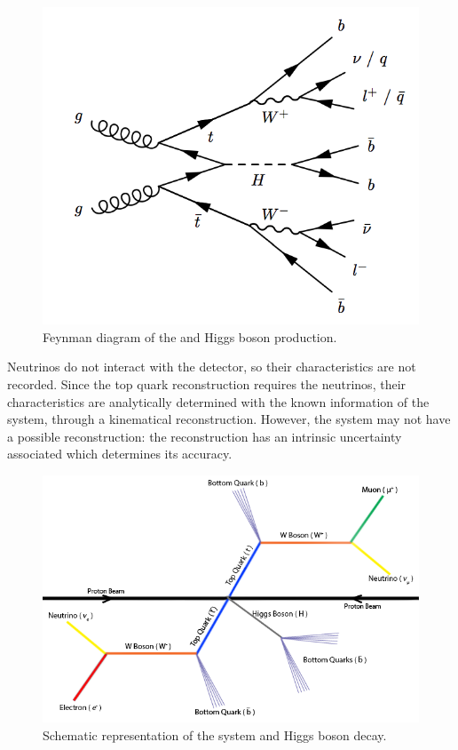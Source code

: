 \begin{figure}[!htp]
	\begin{center}
		\includegraphics[scale=0.3]{imgs/ttH_feynman.png}
		\caption{Feynman diagram of the \ttbar and Higgs boson production.}
		\label{fig:ttH}
	\end{center}
\end{figure}

Neutrinos do not interact with the detector, so their characteristics are not recorded. Since the top quark reconstruction requires the neutrinos, their characteristics are analytically determined with the known information of the system, through a kinematical reconstruction. However, the \ttbar system may not have a possible reconstruction: the reconstruction has an intrinsic uncertainty associated which determines its accuracy.

\begin{figure}[!htp]
	\begin{center}
		\includegraphics[scale=0.45]{imgs/ttbar_higgs.png}
		\caption{Schematic representation of the \ttbar system and Higgs boson decay.}
		\label{fig:ttbar}
	\end{center}
\end{figure}

